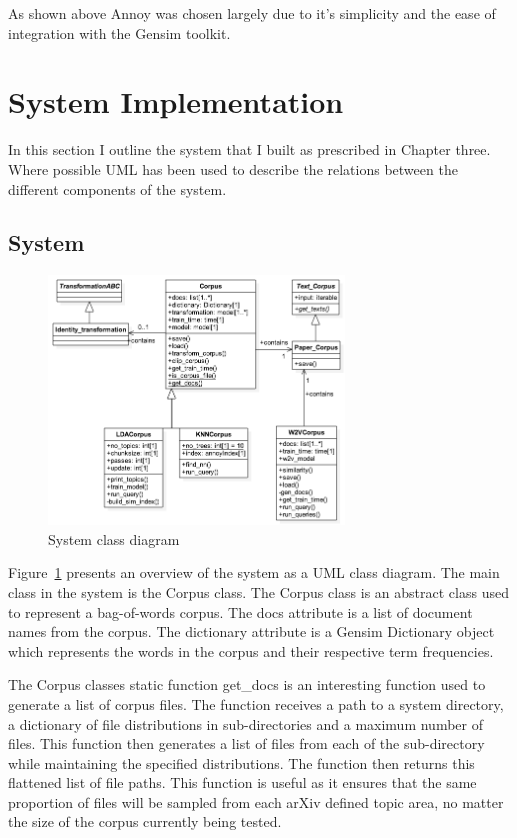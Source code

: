 As shown above Annoy was chosen largely due to it's simplicity and the ease of integration with the Gensim toolkit.

\section{System Implementation}
In this section I outline the system that I built as prescribed in Chapter three.
Where possible UML has been used to describe the relations between the different components of the system.

\subsection{System}
\begin{figure}[h]
    \centering
        \includegraphics[width=0.7\textwidth]{Figures/FYPClassDiagram.png}
    \caption{System class diagram}
    \label{fig:UMLClass}
\end{figure}

Figure~\ref{fig:UMLClass} presents an overview of the system as a UML class diagram.
The main class in the system is the Corpus class.
The Corpus class is an abstract class used to represent a bag-of-words corpus.
The docs attribute is a list of document names from the corpus.
The dictionary attribute is a Gensim Dictionary object which represents the words in the corpus and their respective term frequencies.

The Corpus classes static function get_docs is an interesting function used to generate a list of corpus files.
The function receives a path to a system directory, a dictionary of file distributions in sub-directories and a maximum number of files.
This function then generates a list of files from each of the sub-directory while maintaining the specified distributions.
The function then returns this flattened list of file paths.
This function is useful as it ensures that the same proportion of files will be sampled from each arXiv defined topic area, no matter the size of the corpus currently being tested.

